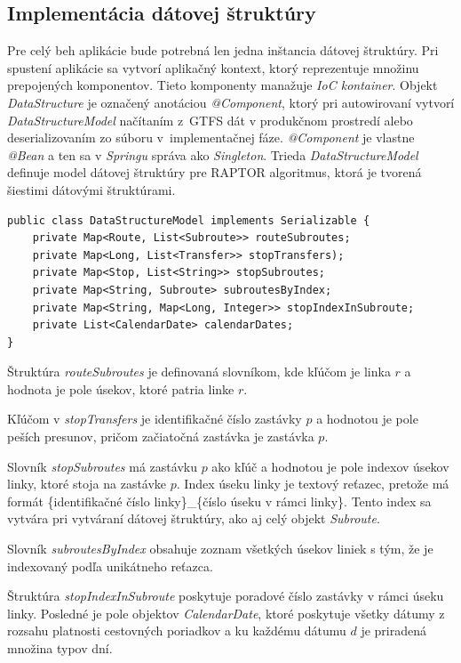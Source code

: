 \subsection{Implementácia dátovej štruktúry}
Pre celý beh aplikácie bude potrebná len jedna inštancia dátovej štruktúry. Pri spustení aplikácie sa vytvorí aplikačný kontext, ktorý reprezentuje množinu prepojených komponentov. Tieto komponenty manažuje \textit{IoC kontainer}. Objekt \textit{DataStructure} je označený anotáciou \textit{@Component}, ktorý pri autowirovaní vytvorí \textit{DataStructureModel} načítaním z~GTFS dát v produkčnom prostredí alebo deserializovaním zo súboru v~implementačnej fáze.\textit{ @Component }je vlastne \textit{@Bean} a ten sa v \textit{Springu} správa ako \textit{Singleton}. 
Trieda \textit{DataStructureModel} definuje model dátovej štruktúry pre RAPTOR algoritmus, ktorá je tvorená šiestimi dátovými štruktúrami. 
\begin{lstlisting}
public class DataStructureModel implements Serializable {
    private Map<Route, List<Subroute>> routeSubroutes;
    private Map<Long, List<Transfer>> stopTransfers);
    private Map<Stop, List<String>> stopSubroutes;
    private Map<String, Subroute> subroutesByIndex;
    private Map<String, Map<Long, Integer>> stopIndexInSubroute;
    private List<CalendarDate> calendarDates;
}
\end{lstlisting}
Štruktúra \textit{routeSubroutes} je definovaná slovníkom, kde kľúčom je linka $r$ a hodnota je pole úsekov, ktoré patria linke $r$. 

Kľúčom v \textit{stopTransfers} je identifikačné číslo zastávky $p$ a hodnotou je pole peších presunov, pričom začiatočná zastávka je zastávka $p$. 

Slovník \textit{stopSubroutes} má zastávku $p$ ako kľúč a hodnotou je pole indexov úsekov linky, ktoré stoja na zastávke $p$. Index úseku linky je textový reťazec, pretože má formát \{identifikačné číslo linky\}\_\{číslo úseku v rámci linky\}. Tento index sa vytvára pri vytváraní dátovej štruktúry, ako aj celý objekt \textit{Subroute}. 

Slovník \textit{subroutesByIndex} obsahuje zoznam všetkých úsekov liniek s tým, že je indexovaný podľa unikátneho reťazca.

Štruktúra \textit{stopIndexInSubroute} poskytuje poradové číslo zastávky v rámci úseku linky. Posledné je pole objektov \textit{CalendarDate}, ktoré poskytuje  všetky dátumy z rozsahu platnosti cestovných poriadkov a ku každému dátumu $d$ je priradená množina typov dní. 


